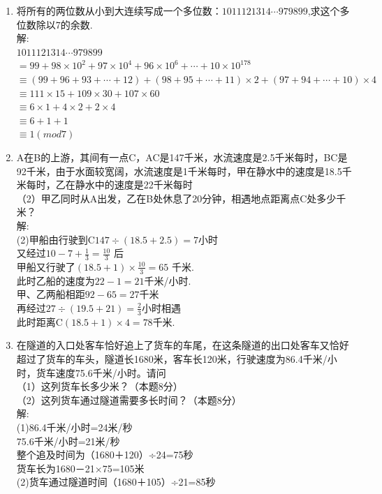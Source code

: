 \documentclass[12pt,oneside,a4paper]{ctexbook} %
\numberwithin{chapter}{part}
\begin{document}
\begin{enumerate}
\item 
将所有的两位数从小到大连续写成一个多位数：$1011121314\cdots979899$,求这个多位数除以7的余数.\\
解:\\
$1011121314\cdots979899$\\
$=99+98\times10^2+97\times10^4+96\times10^6+\cdots+10\times10^{178}$\\
$\equiv(99+96+93+\cdots+12)+(98+95+\cdots+11)\times2+(97+94+\cdots+10)\times4$\\
$\equiv111\times15+109\times30+107\times60$\\
$\equiv6\times1+4\times2+2\times4$\\
$\equiv6+1+1$\\
$\equiv1(mod 7)$

\item 
A在B的上游，其间有一点C，AC是147千米，水流速度是2.5千米每时，BC是92千米，由于水面较宽阔，水流速度是1千米每时，甲在静水中的速度是18.5千米每时，乙在静水中的速度是22千米每时\\
（2）甲乙同时从A出发，乙在B处休息了20分钟，相遇地点距离点C处多少千米？\\
解:\\
(2)甲船由行驶到C$147\div(18.5+2.5)=7$小时\\
又经过$10-7+\frac{1}{3}=\frac{10}{3}$ 后\\
甲船又行驶了$(18.5+1)\times\frac{10}{3}=65$ 千米.\\
此时乙船的速度为$22-1=21$千米/小时.\\
甲、乙两船相距$92-65=27$千米\\
再经过$27\div(19.5+21)=\frac{2}{3}$小时相遇\\
此时距离C$(18.5+1)\times4=78$千米.

\item 
在隧道的入口处客车恰好追上了货车的车尾，在这条隧道的出口处客车又恰好超过了货车的车头，隧道长1680米，客车长120米，行驶速度为86.4千米/小时，货车速度75.6千米/小时。请问\\
（1）这列货车长多少米？（本题8分）\\
（2）这列货车通过隧道需要多长时间？（本题8分）\\
解:\\
(1)86.4千米/小时=24米/秒 \\
  75.6千米/小时=21米/秒\\
  整个追及时间为（1680＋120）÷24=75秒\\
 货车长为1680－21×75=105米\\
(2)货车通过隧道时间（1680＋105）÷21=85秒


\end{enumerate}
\end{document}
